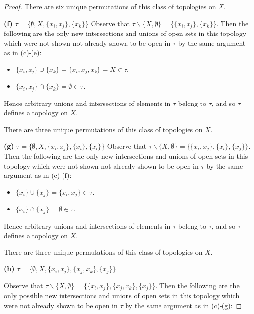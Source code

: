 \begin{proof}
        There are six unique permutations of this class of topologies on $X$.
    
    \textbf{(f)} $\tau = \{\emptyset, X, \{x_i, x_j\}, \{x_k\}\}$
        Observe that $\tau \backslash \{X, \emptyset\} = \{\{x_i, x_j\}, \{x_k\}\}$.
        Then the following are the only new intersections and unions of open sets in this topology which were not shown
        not already shown to be open in $\tau$ by the same argument as in (c)-(e):
        
        \begin{itemize}
            \item $\{x_i, x_j\} \cup \{x_k\} = \{x_i, x_j, x_k\} = X \in \tau$.
            \item $\{x_i, x_j\} \cap \{x_k\} = \emptyset \in \tau$.
        \end{itemize}
        Hence arbitrary unions and intersections of elements in $\tau$ belong to $\tau$, and so $\tau$ defines a 
        topology on $X$.
        
        There are three unique permutations of this class of topologies on $X$.

    \textbf{(g)} $\tau = \{\emptyset, X, \{x_i, x_j\}, \{x_i\}, \{x_i\}\}$
        Observe that $\tau \backslash \{X, \emptyset\} = \{\{x_i, x_j\}, \{x_i\}, \{x_j\} \}$.
        Then the following are the only new intersections and unions of open sets in this topology which were not shown
        not already shown to be open in $\tau$ by the same argument as in (c)-(f):
        
        \begin{itemize}
            \item $\{x_i\} \cup \{x_j\} = \{x_i, x_j\} \in \tau$.
            \item $\{x_i\} \cap \{x_j\} = \emptyset \in \tau$.
        \end{itemize}
        Hence arbitrary unions and intersections of elements in $\tau$ belong to $\tau$, and so $\tau$ defines a 
        topology on $X$.
        
        There are three unique permutations of this class of topologies on $X$.
    
    \pagebreak
    \textbf{(h)} $\tau = \{\emptyset, X, \{x_i, x_j\}, \{x_j, x_k\}, \{x_j\}\}$
        
        Observe that $\tau \backslash \{X, \emptyset\} = \{\{x_i, x_j\}, \{x_j, x_k\}, \{x_j\} \}$.
        Then the following are the only possible new intersections and unions of open sets in this topology which were 
        not already shown to be open in $\tau$ by the same argument as in (c)-(g):
        

\end{proof}

